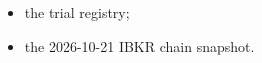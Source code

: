 \documentclass{article}
\begin{document}
\begin{itemize}
\begin{itemize}
\item the trial registry;

\item the 2026-10-21 IBKR chain snapshot.

\end{itemize}

\end{itemize}
\end{document}
